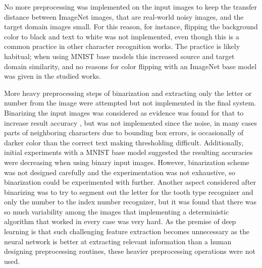 \documentclass{article}
\begin{document}

No more preprocessing was implemented on the input images to keep the transfer distance between 
ImageNet images, that are real-world noisy images, and the target domain images small. For this reason, 
for instance, flipping the background color to black and text to white was not implemented, even though this 
is a common practice in other character recognition works. The practice is likely 
habitual; when using MNIST base models this increased source and target domain similarity,
and no reasons for color flipping with an ImageNet base model was given in the studied works.


More heavy preprocessing steps of binarization and extracting only the letter or number from the image were 
attempted but not implemented in the final system.
Binarizing the input images was considered as evidence was found for that to increase result accuracy \cite{9thuonPalm},
but was not implemented since the noise, in many cases
 parts of neighboring characters due to bounding box errors, is occasionally of darker 
color than the correct text making thresholding difficult. Additionally,
 initial experiments with a MNIST base model suggested the resulting
accuracies were decreasing when using binary input images. However, binarization scheme was not designed carefully 
and the experimentation was not exhaustive, so binarization could be experimented with further.
Another aspect considered after binarizing was to try to segment out the letter for the tooth type recognizer 
and only the number to the index number recognizer, but it was found that there was so much variability 
among the images that implementing a deterministic algorithm that worked in every case was very hard. 
As the premise of deep learning is that such challenging feature extraction becomes unnecessary as the neural 
network is better at extracting relevant information than a human designing preprocessing routines, these 
heavier preprocessing operations were not used.
\end{document}
